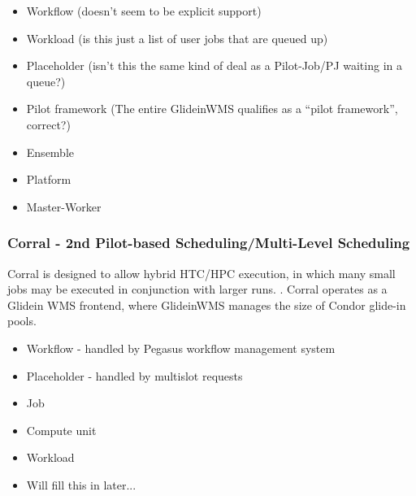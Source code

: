\documentclass{sig-alternate}
\begin{document}
\begin{itemize}
\item Workflow (doesn't seem to be explicit support)
\item Workload (is this just a list of user jobs that are queued up)
\item Placeholder (isn't this the same kind of deal as a Pilot-Job/PJ
waiting in a queue?)
\item Pilot framework (The entire GlideinWMS qualifies as a ``pilot
framework'', correct?)
\item Ensemble 
\item Platform 
\item Master-Worker 
\end{itemize}

\subsubsection{Corral - 2nd Pilot-based Scheduling/Multi-Level Scheduling}

Corral is designed to allow hybrid HTC/HPC execution, in which
many small jobs may be executed in conjunction with larger runs. 
\cite{Rynge:2011:EUG:2116259.2116599}
.  Corral operates as a Glidein
WMS frontend, where GlideinWMS manages the size
of Condor glide-in pools.
\begin{itemize}
\item Workflow - handled by Pegasus workflow management system
\item Placeholder - handled by multislot requests 
\item Job
\item Compute unit
\item Workload 
\item Will fill this in later...
\end{itemize}
\end{document}
